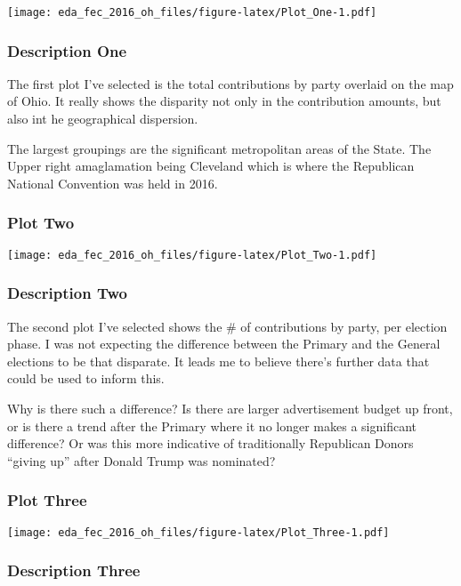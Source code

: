 \documentclass[]{article}
\begin{document}
\texttt{[image: eda\_fec\_2016\_oh\_files/figure-latex/Plot\_One-1.pdf]}

\hypertarget{description-one}{%
\subsubsection{Description One}\label{description-one}}

The first plot I've selected is the total contributions by party
overlaid on the map of Ohio. It really shows the disparity not only in
the contribution amounts, but also int he geographical dispersion.

The largest groupings are the significant metropolitan areas of the
State. The Upper right amaglamation being Cleveland which is where the
Republican National Convention was held in 2016.

\hypertarget{plot-two}{%
\subsubsection{Plot Two}\label{plot-two}}

\texttt{[image: eda\_fec\_2016\_oh\_files/figure-latex/Plot\_Two-1.pdf]}

\hypertarget{description-two}{%
\subsubsection{Description Two}\label{description-two}}

The second plot I've selected shows the \# of contributions by party,
per election phase. I was not expecting the difference between the
Primary and the General elections to be that disparate. It leads me to
believe there's further data that could be used to inform this.

Why is there such a difference? Is there are larger advertisement budget
up front, or is there a trend after the Primary where it no longer makes
a significant difference? Or was this more indicative of traditionally
Republican Donors ``giving up'' after Donald Trump was nominated?

\hypertarget{plot-three}{%
\subsubsection{Plot Three}\label{plot-three}}

\texttt{[image: eda\_fec\_2016\_oh\_files/figure-latex/Plot\_Three-1.pdf]}

\hypertarget{description-three}{%
\subsubsection{Description Three}\label{description-three}}
\end{document}
